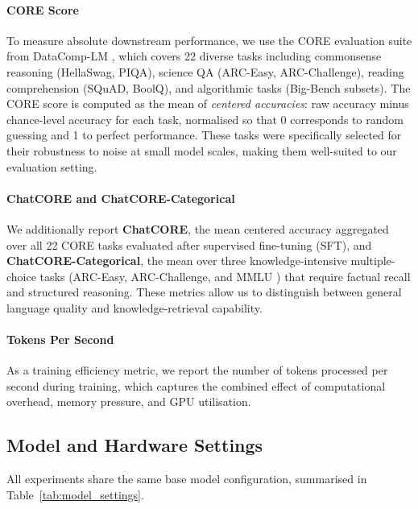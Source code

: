 \paragraph{CORE Score}
To measure absolute downstream performance, we use the CORE evaluation suite from
DataComp-LM \parencite{li2025datacomplmsearchgenerationtraining}, which covers 22 diverse tasks
including commonsense reasoning (HellaSwag, PIQA), science QA (ARC-Easy, ARC-Challenge),
reading comprehension (SQuAD, BoolQ), and algorithmic tasks (Big-Bench subsets).
The CORE score is computed as the mean of \emph{centered accuracies}: raw accuracy minus
chance-level accuracy for each task, normalised so that 0 corresponds to random guessing and 1
to perfect performance.
These tasks were specifically selected for their robustness to noise at small model scales,
making them well-suited to our evaluation setting.

\paragraph{ChatCORE and ChatCORE-Categorical}
We additionally report \textbf{ChatCORE}, the mean centered accuracy aggregated over all 22 CORE
tasks evaluated after supervised fine-tuning (SFT), and \textbf{ChatCORE-Categorical}, the mean
over three knowledge-intensive multiple-choice tasks (ARC-Easy, ARC-Challenge, and MMLU
\parencite{hendrycks2021measuringmassivemultitasklanguage}) that require factual recall and
structured reasoning.
These metrics allow us to distinguish between general language quality and knowledge-retrieval
capability.

\paragraph{Tokens Per Second}
As a training efficiency metric, we report the number of tokens processed per second during
training, which captures the combined effect of computational overhead, memory pressure, and GPU
utilisation.

\subsection{Model and Hardware Settings}

All experiments share the same base model configuration, summarised in
Table~\ref{tab:model_settings}.

